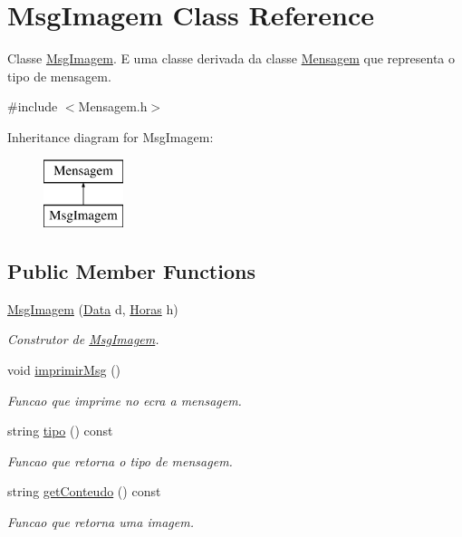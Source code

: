 \hypertarget{class_msg_imagem}{}\section{Msg\+Imagem Class Reference}
\label{class_msg_imagem}


Classe \hyperlink{class_msg_imagem}{Msg\+Imagem}. E uma classe derivada da classe \hyperlink{class_mensagem}{Mensagem} que representa o tipo de mensagem.  




{\ttfamily \#include $<$Mensagem.\+h$>$}

Inheritance diagram for Msg\+Imagem\+:\begin{figure}[H]
\begin{center}
\leavevmode
\includegraphics[height=2.000000cm]{class_msg_imagem}
\end{center}
\end{figure}
\subsection*{Public Member Functions}
\begin{DoxyCompactItemize}
\item 
\hyperlink{class_msg_imagem_af214317005643374b9886897ddc28e9c}{Msg\+Imagem} (\hyperlink{class_data}{Data} d, \hyperlink{class_horas}{Horas} h)
\begin{DoxyCompactList}\small\item\em Construtor de \hyperlink{class_msg_imagem}{Msg\+Imagem}. \end{DoxyCompactList}\item 
\hypertarget{class_msg_imagem_a70e0cf4e47ecaee095501d211e010e27}{}void \hyperlink{class_msg_imagem_a70e0cf4e47ecaee095501d211e010e27}{imprimir\+Msg} ()\label{class_msg_imagem_a70e0cf4e47ecaee095501d211e010e27}

\begin{DoxyCompactList}\small\item\em Funcao que imprime no ecra a mensagem. \end{DoxyCompactList}\item 
string \hyperlink{class_msg_imagem_a031cfa1eb0a38eb9f95d2d3b5e569c2e}{tipo} () const 
\begin{DoxyCompactList}\small\item\em Funcao que retorna o tipo de mensagem. \end{DoxyCompactList}\item 
string \hyperlink{class_msg_imagem_accf2ff0d0a89b5cff9051eaad8930e25}{get\+Conteudo} () const 
\begin{DoxyCompactList}\small\item\em Funcao que retorna uma \textquotesingle{}imagem\textquotesingle{}. \end{DoxyCompactList}\end{DoxyCompactItemize}
